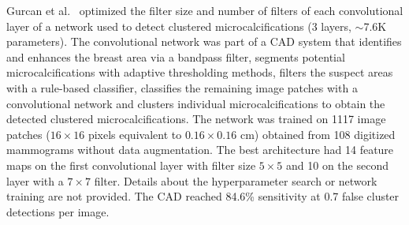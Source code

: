 \begin{comment}
- detect microcalcificication
- compares the optimized version with a manually selected one.
- 108 digitized mamograms for training, 152 for validation and 472 for test(253 malignant) (pixel size 0.1mm)
- Each region is preprocessed to retain the breast, each possible microcalcification is segmented and then they are classified. Classification: rule based classifier, then the convnet and then each microcalcification is regionally clustered
- optimizes number of feature mpas per layer and filter sizes
- used simulated annealing, a genentic algorithm and hillclimbing, with the AUC as the objective function.
- some of the false positives detected were deleted. dataset balanced
- from 77.2 %
-"The optima! architecture (N1-N2-K1-K2) was determined to be 14-4-5-5 when the architecture was trained with group ! and tested with group 2 and 14-10-5-7 when the training and thetest sets were switched."
- accuracy can be improved by seleecting a good architecture (it clashes with wath people teaches now).
- using bad scanners results in lower performance.
- 14 and 10 feature maps seem to be the max possible feature maps (from Gurcan2000). result is not valid then. WOuldn't be useful anyway
- Don't say the total number of preselected ROIs in the test set
- Don't say how each method works or what ranges each looks for, or how did the selected architectures compare to the not selected ones.
- Don't say exactly what method was used GA, simulated annealing(i think this one!) or hill-climbing.
\end{comment}
Gurcan et al.~\cite{Gurcan2002} optimized the filter size and number of filters of each convolutional layer of a network used to detect clustered microcalcifications (3 layers, $\sim$7.6K parameters). The convolutional network was part of a CAD system that identifies and enhances the breast area via a bandpass filter, segments potential microcalcifications with adaptive thresholding methods, filters the suspect areas with a rule-based classifier, classifies the remaining image patches with a convolutional network and clusters individual microcalcifications to obtain the detected clustered microcalcifications. The network was trained on 1117 image patches ($16 \times 16$ pixels equivalent to $0.16 \times 0.16$ cm) obtained from 108 digitized mammograms without data augmentation. The best architecture had 14 feature maps on the first convolutional layer with filter size $5\times 5$ and 10 on the second layer with a $7 \times 7$ filter. Details about the hyperparameter search or network training are not provided. The CAD reached 84.6\% sensitivity at 0.7 false cluster detections per image. 
